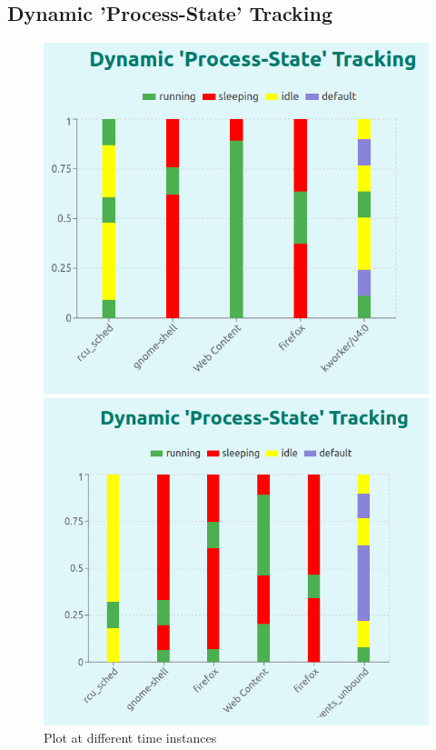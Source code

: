 \documentclass[12pt]{article}
\begin{document}
\subsection{Dynamic 'Process-State' Tracking}
\begin{figure}[H]
    \centering
    \begin{minipage}{0.45\textwidth}
        \centering
        \includegraphics[width=\textwidth]{logos and images/GANTT_1.png}
    \end{minipage}
    \hfill
    \begin{minipage}{0.45\textwidth}
        \centering
        \includegraphics[width=\textwidth]{logos and images/GANTT_2.png}
    \end{minipage}
    \caption{Plot at different time instances}
\end{figure}
\end{document}
